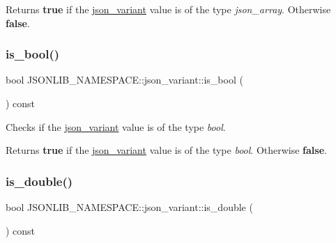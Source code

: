 \begin{DoxyReturn}{Returns}
{\bfseries true} if the \hyperlink{classJSONLIB__NAMESPACE_1_1json__variant}{json\+\_\+variant} value is of the type {\itshape json\+\_\+array}. Otherwise {\bfseries false}. 
\end{DoxyReturn}
\mbox{\label{classJSONLIB__NAMESPACE_1_1json__variant_a99bd3f5d21800b7b1cc7af956c17d534}} 
\subsubsection{\texorpdfstring{is\+\_\+bool()}{is\_bool()}}
{\footnotesize\ttfamily bool J\+S\+O\+N\+L\+I\+B\+\_\+\+N\+A\+M\+E\+S\+P\+A\+C\+E\+::json\+\_\+variant\+::is\+\_\+bool (\begin{DoxyParamCaption}{ }\end{DoxyParamCaption}) const}



Checks if the \hyperlink{classJSONLIB__NAMESPACE_1_1json__variant}{json\+\_\+variant} value is of the type {\itshape bool}. 

\begin{DoxyReturn}{Returns}
{\bfseries true} if the \hyperlink{classJSONLIB__NAMESPACE_1_1json__variant}{json\+\_\+variant} value is of the type {\itshape bool}. Otherwise {\bfseries false}. 
\end{DoxyReturn}
\mbox{\label{classJSONLIB__NAMESPACE_1_1json__variant_a7f294ce9b078aca12e0f96df7275ff0b}} 
\subsubsection{\texorpdfstring{is\+\_\+double()}{is\_double()}}
{\footnotesize\ttfamily bool J\+S\+O\+N\+L\+I\+B\+\_\+\+N\+A\+M\+E\+S\+P\+A\+C\+E\+::json\+\_\+variant\+::is\+\_\+double (\begin{DoxyParamCaption}{ }\end{DoxyParamCaption}) const}



